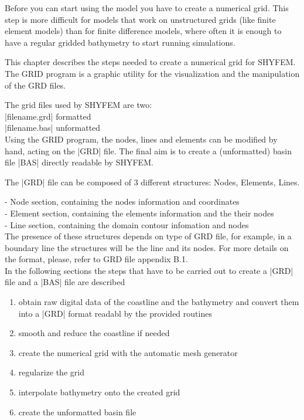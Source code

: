 
Before you can start using the model you have to create a numerical grid.
This step is more difficult for models that work on unstructured grids
(like finite element models) than for finite difference models, where
often it is enough to have a regular gridded bathymetry to start running
simulations.

This chapter describes the steps needed to create a numerical grid for SHYFEM.
The GRID program is a graphic utility for the visualization and the manipulation of the GRD files.

The grid files used by SHYFEM are two:\\

|filename.grd| formatted\\
|filename.bas| unformatted\\

Using the GRID program, the nodes, lines and elements can be modified by hand, 
acting on the |GRD| file. The final aim is to create a (unformatted) basin 
file |BAS| directly readable by SHYFEM.

The |GRD| file can be composed of 3 different structures: Nodes, Elements, Lines.

- Node section, containing the nodes information and coordinates\\
- Element section, containing the elements information and the their nodes\\
- Line section, containing the domain contour infomation and nodes\\

The presence of these structures depends on type of GRD file, for example,
in a boundary line the structures will be the line and its nodes.
For more details on the format, please, refer to GRD file appendix B.1.\\

In the following sections the steps that have to be carried out 
to create a |GRD| file and a |BAS| file are described

\begin{enumerate}

\item obtain raw digital data of the coastline and the bathymetry and
  convert them into a |GRD| format readabl by the provided routines

\item smooth and reduce the coastline if needed

\item create the numerical grid with the automatic mesh generator

\item regularize the grid

\item interpolate bathymetry onto the created grid

\item create the unformatted basin file

\end{enumerate}

